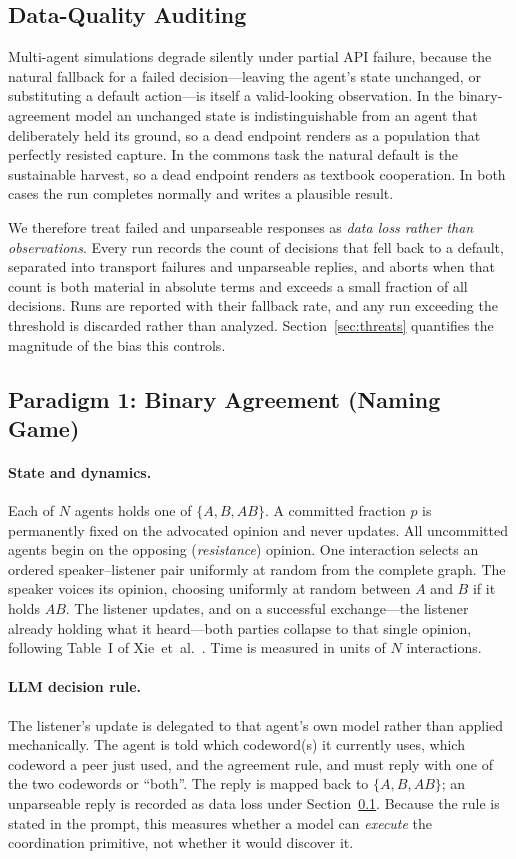 \documentclass[manuscript,screen,review]{acmart}
\begin{document}
{\subsection{Data-Quality Auditing}
\label{sec:methods-audit}
Multi-agent simulations degrade silently under partial API failure, because the
natural fallback for a failed decision---leaving the agent's state unchanged, or
substituting a default action---is itself a valid-looking observation. In the
binary-agreement model an unchanged state is indistinguishable from an agent that
deliberately held its ground, so a dead endpoint renders as a population that
perfectly resisted capture. In the commons task the natural default is the
sustainable harvest, so a dead endpoint renders as textbook cooperation. In both
cases the run completes normally and writes a plausible result.

We therefore treat failed and unparseable responses as \emph{data loss rather
than observations}. Every run records the count of decisions that fell back to a
default, separated into transport failures and unparseable replies, and aborts
when that count is both material in absolute terms and exceeds a small fraction
of all decisions. Runs are reported with their fallback rate, and any run
exceeding the threshold is discarded rather than analyzed. Section~\ref{sec:threats}
quantifies the magnitude of the bias this controls.

\subsection{Paradigm 1: Binary Agreement (Naming Game)}
\label{sec:methods-ng}
\paragraph{State and dynamics.} Each of $N$ agents holds one of
$\{A, B, AB\}$. A committed fraction $p$ is permanently fixed on the advocated
opinion and never updates. All uncommitted agents begin on the opposing
(\emph{resistance}) opinion. One interaction selects an ordered speaker--listener
pair uniformly at random from the complete graph. The speaker voices its opinion,
choosing uniformly at random between $A$ and $B$ if it holds $AB$. The listener
updates, and on a successful exchange---the listener already holding what it
heard---both parties collapse to that single opinion, following Table~I of
Xie~et~al.~\cite{xie2011}. Time is measured in units of $N$ interactions.

\paragraph{LLM decision rule.} The listener's update is delegated to that agent's
own model rather than applied mechanically. The agent is told which codeword(s)
it currently uses, which codeword a peer just used, and the agreement rule, and
must reply with one of the two codewords or ``both''. The reply is mapped back to
$\{A, B, AB\}$; an unparseable reply is recorded as data loss under
Section~\ref{sec:methods-audit}. Because the rule is stated in the prompt, this
measures whether a model can \emph{execute} the coordination primitive, not
whether it would discover it.

}
\end{document}
